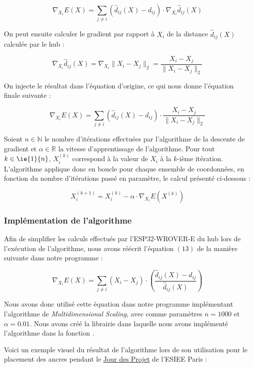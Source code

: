$$\nabla_{X_i} E(X) = \sum_{j \neq i} \left( \hat{d}_{ij}(X) - d_{ij} \right) \cdot \nabla_{X_i} \hat{d}_{ij}(X)$$

On peut ensuite calculer le gradient par rapport à $X_i$ de la distance $\hat{d}_{ij}(X)$ calculée par le hub :

$$\nabla_{X_i} \hat{d}_{ij}(X) = \nabla_{X_i} \|X_i - X_j\|_2 = \frac{X_i - X_j}{\|X_i - X_j\|_2}$$

On injecte le résultat dans l'équation d'origine, ce qui nous donne l'équation finale suivante : 

\begin{equation}
   \nabla_{X_i} E(X) = \sum_{j \neq i} \left( \hat{d}_{ij}(X) - d_{ij} \right) \cdot \frac{X_i - X_j}{\|X_i - X_j\|_2}
\end{equation}

Soient $n \in \mathbb{N}$ le nombre d'itérations effectuées par l'algorithme de la descente de gradient et $\alpha \in \mathbb{R}$ la vitesse d'apprentissage de l'algorithme. Pour tout $k \in \ie{1}{n}$, $X_i^{(k)}$ correspond à la valeur de $X_i$ à la $k$-ième itération. L'algorithme applique donc en boucle pour chaque ensemble de coordonnées, en fonction du nombre d'itérations passé en paramètre, le calcul présenté ci-dessous : 

$$X_i^{(k+1)} = X_i^{(k)} - \alpha \cdot \nabla_{X_i} E(X^{(k)})$$

\subsubsection{Implémentation de l'algorithme}

Afin de simplifier les calculs effectués par l'ESP32-WROVER-E du hub lors de l'exécution de l'algorithme, nous avons réécrit l'équation $(13)$ de la manière suivante dans notre programme :

$$\nabla_{X_i} E(X) = \sum_{j \neq i} (X_i - X_j) \cdot \left( \frac{\hat{d}_{ij}(X) - d_{ij}}{\hat{d}_{ij}(X)} \right)$$

Nous avons donc utilisé cette équation dans notre programme implémentant l'algorithme de \emph{Multidimensional Scaling}, avec comme paramètres $n=1000$ et $\alpha=0.01$. Nous avons créé la librairie {} dans laquelle nous avons implémenté l'algorithme dans la fonction {}.

Voici un exemple visuel du résultat de l'algorithme lors de son utilisation pour le placement des ancres pendant le \uline{Jour des Projet} de l'ESIEE Paris :

